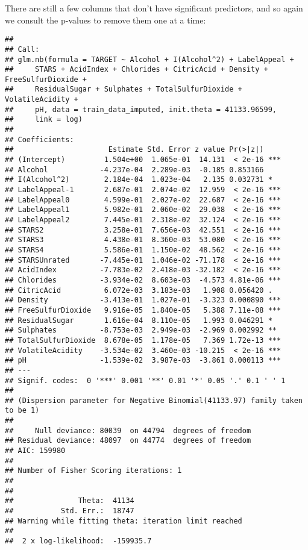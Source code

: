 \documentclass[
]{article}
\begin{document}
There are still a few columns that don't have significant predictors,
and so again we consult the p-values to remove them one at a time:

\begin{verbatim}
## 
## Call:
## glm.nb(formula = TARGET ~ Alcohol + I(Alcohol^2) + LabelAppeal + 
##     STARS + AcidIndex + Chlorides + CitricAcid + Density + FreeSulfurDioxide + 
##     ResidualSugar + Sulphates + TotalSulfurDioxide + VolatileAcidity + 
##     pH, data = train_data_imputed, init.theta = 41133.96599, 
##     link = log)
## 
## Coefficients:
##                      Estimate Std. Error z value Pr(>|z|)    
## (Intercept)         1.504e+00  1.065e-01  14.131  < 2e-16 ***
## Alcohol            -4.237e-04  2.289e-03  -0.185 0.853166    
## I(Alcohol^2)        2.184e-04  1.023e-04   2.135 0.032731 *  
## LabelAppeal-1       2.687e-01  2.074e-02  12.959  < 2e-16 ***
## LabelAppeal0        4.599e-01  2.027e-02  22.687  < 2e-16 ***
## LabelAppeal1        5.982e-01  2.060e-02  29.038  < 2e-16 ***
## LabelAppeal2        7.445e-01  2.318e-02  32.124  < 2e-16 ***
## STARS2              3.258e-01  7.656e-03  42.551  < 2e-16 ***
## STARS3              4.438e-01  8.360e-03  53.080  < 2e-16 ***
## STARS4              5.586e-01  1.150e-02  48.562  < 2e-16 ***
## STARSUnrated       -7.445e-01  1.046e-02 -71.178  < 2e-16 ***
## AcidIndex          -7.783e-02  2.418e-03 -32.182  < 2e-16 ***
## Chlorides          -3.934e-02  8.603e-03  -4.573 4.81e-06 ***
## CitricAcid          6.072e-03  3.183e-03   1.908 0.056420 .  
## Density            -3.413e-01  1.027e-01  -3.323 0.000890 ***
## FreeSulfurDioxide   9.916e-05  1.840e-05   5.388 7.11e-08 ***
## ResidualSugar       1.616e-04  8.110e-05   1.993 0.046291 *  
## Sulphates          -8.753e-03  2.949e-03  -2.969 0.002992 ** 
## TotalSulfurDioxide  8.678e-05  1.178e-05   7.369 1.72e-13 ***
## VolatileAcidity    -3.534e-02  3.460e-03 -10.215  < 2e-16 ***
## pH                 -1.539e-02  3.987e-03  -3.861 0.000113 ***
## ---
## Signif. codes:  0 '***' 0.001 '**' 0.01 '*' 0.05 '.' 0.1 ' ' 1
## 
## (Dispersion parameter for Negative Binomial(41133.97) family taken to be 1)
## 
##     Null deviance: 80039  on 44794  degrees of freedom
## Residual deviance: 48097  on 44774  degrees of freedom
## AIC: 159980
## 
## Number of Fisher Scoring iterations: 1
## 
## 
##               Theta:  41134 
##           Std. Err.:  18747 
## Warning while fitting theta: iteration limit reached 
## 
##  2 x log-likelihood:  -159935.7
\end{verbatim}
\end{document}
